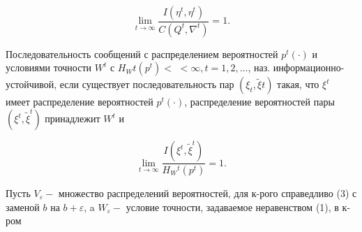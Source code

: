 \documentclass[10pt]{article}
\begin{document}
\[

\lim _{t \rightarrow \infty} \frac{I\left(\eta^{t}, \eta^{t}\right)}{C\left(Q^{t}, \nabla^{t}\right)}=1 .

\]



Последовательность сообщений с распределением вероятностей $p^{t}(\cdot)$ и условиями точности $W^{t}$ с $H_{W} t\left(p^{t}\right)<$ $<\infty, t=1,2, \ldots$, наз. информационно-устойчивой, если существует последовательность пар $\left(\xi_{t}, \tilde{\xi} t\right)$ такая, что $\xi^{t}$ имеет распределение вероятностей $p^{t}(\cdot)$, распределение вероятностей пары $\left(\xi^{t}, \tilde{\xi}^{t}\right)$ принадлежит $W^{t}$ и



\[

\lim _{t \rightarrow \infty} \frac{I\left(\xi^{t}, \tilde{\xi}^{t}\right)}{H_{W}{ }^{t}\left(p^{t}\right)}=1 .

\]



Пусть $V_{\varepsilon}-$ множество распределений вероятностей, для к-рого справедливо (3) с заменой $b$ на $b+\varepsilon$, a $W_{\varepsilon}-$ условие точности, задаваемое неравенством (1), в к-ром
\end{document}
